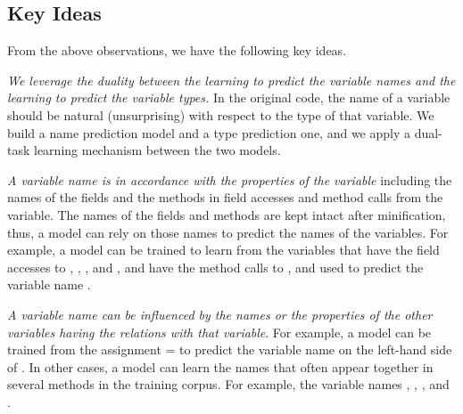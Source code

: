 \subsection{Key Ideas}
\label{key:sec}

From the above observations, we have the following key ideas.

 {\em We leverage the duality between the
  learning to predict the variable names and the learning to predict
  the variable types.} In the original code, the name of a variable
should be natural (unsurprising) with respect to the type of that
variable. We build a name prediction model and a type prediction one,
and we apply a dual-task learning mechanism between the two models.




 {\em A variable name is in accordance with
  the properties of the variable} including the names of the fields
and the methods in field accesses and method calls from the variable.
The names of the fields and methods are kept intact after
minification, thus, a model can rely on those names to predict the
names of the variables. For example, a model can be trained to learn
from the variables that have the field accesses to
, , , and
, and have the method calls to ,
and used to predict the variable name .

 {\em A variable name can be influenced by
  the names or the properties of the other variables having the
  relations with that variable}. For example, a model can be trained
from the assignment  =
 to predict the variable name on the
left-hand side of . In other cases, a
model can learn the names that often appear together in several
methods in the training corpus. For example, the variable names
, , , and
.


